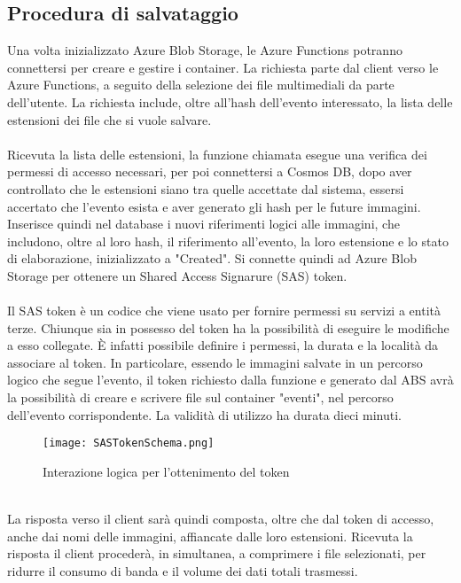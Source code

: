 \subsection{Procedura di salvataggio}

Una volta inizializzato Azure Blob Storage, le Azure Functions potranno connettersi per 
creare e gestire i container.
La richiesta parte dal client verso le Azure Functions, 
a seguito della selezione dei file multimediali da parte dell'utente.
La richiesta include, oltre all'hash dell'evento interessato, la lista delle estensioni dei file che si vuole salvare.\\
\\
Ricevuta la lista delle estensioni, 
la funzione chiamata esegue una verifica dei permessi di accesso necessari,
per poi connettersi a Cosmos DB, 
dopo aver controllato che le estensioni siano tra quelle accettate dal sistema,
essersi accertato che l'evento esista e aver generato gli hash per le future immagini.
Inserisce quindi nel database i nuovi riferimenti logici alle immagini,
che includono, oltre al loro hash, il riferimento all'evento, la loro estensione
e lo stato di elaborazione, inizializzato a "Created".
Si connette quindi ad Azure Blob Storage per ottenere un Shared Access Signarure (SAS) token.\\
\\
Il SAS token è un codice che viene usato per fornire permessi su servizi a entità terze.
Chiunque sia in possesso del token ha la possibilità di eseguire le modifiche a esso collegate. 
È infatti possibile definire i permessi, la durata e la località da associare al token.
In particolare, essendo le immagini salvate in un percorso logico che segue l'evento,
il token richiesto dalla funzione e generato dal ABS 
avrà la possibilità di creare e scrivere file sul container "eventi", 
nel percorso dell'evento corrispondente.
La validità di utilizzo ha durata dieci minuti.\\
\begin{figure}[h!]
    \centering
    \texttt{[image: SASTokenSchema.png]}
    \caption{Interazione logica per l'ottenimento del token}
\end{figure}
\\
La risposta verso il client sarà quindi composta, oltre che dal token di accesso, 
anche dai nomi delle immagini, affiancate dalle loro estensioni.
Ricevuta la risposta il client procederà, in simultanea, 
a comprimere i file selezionati, 
per ridurre il consumo di banda e il volume dei dati totali trasmessi.
